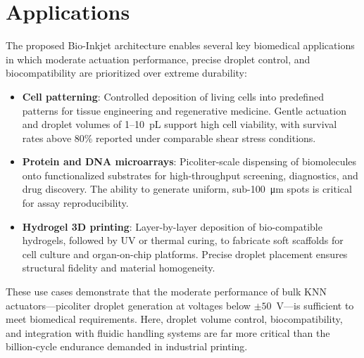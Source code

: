 \section{Applications}
The proposed Bio-Inkjet architecture enables several key biomedical
applications in which moderate actuation performance, precise droplet
control, and biocompatibility are prioritized over extreme durability:
\begin{itemize}
  \item \textbf{Cell patterning}: 
        Controlled deposition of living cells into predefined patterns
        for tissue engineering and regenerative medicine.
        Gentle actuation and droplet volumes of 1--10~\si{\pico\liter}
        support high cell viability, with survival rates above 80\%
        reported under comparable shear stress conditions.
  \item \textbf{Protein and DNA microarrays}: 
        Picoliter-scale dispensing of biomolecules onto functionalized
        substrates for high-throughput screening, diagnostics, and
        drug discovery.
        The ability to generate uniform, sub-100~\si{\micro\meter}
        spots is critical for assay reproducibility.
  \item \textbf{Hydrogel 3D printing}: 
        Layer-by-layer deposition of bio-compatible hydrogels, followed
        by UV or thermal curing, to fabricate soft scaffolds for cell
        culture and organ-on-chip platforms.
        Precise droplet placement ensures structural fidelity and
        material homogeneity.
\end{itemize}

These use cases demonstrate that the moderate performance of bulk KNN
actuators---picoliter droplet generation at voltages below
$\pm 50$~V---is sufficient to meet biomedical requirements.
Here, droplet volume control, biocompatibility, and integration with
fluidic handling systems are far more critical than the billion-cycle
endurance demanded in industrial printing.
